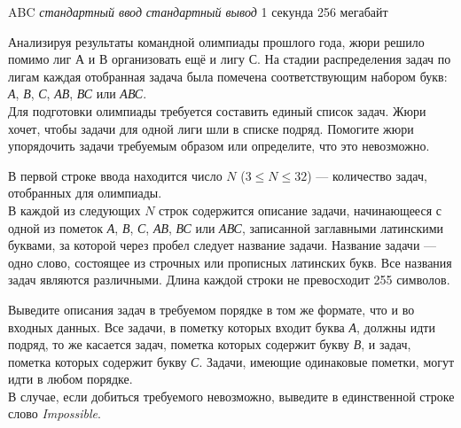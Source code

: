 \begin{problem}%
{ABC}%
{\textsl{стандартный ввод}}%
{\textsl{стандартный вывод}}%
{1 секунда}%
{256 мегабайт}{}

Анализируя результаты командной олимпиады прошлого года, жюри решило помимо лиг А и В организовать ещё и лигу С. На стадии распределения задач по лигам каждая отобранная задача была помечена соответствующим набором букв: \textit{А}, \textit{В}, \textit{С}, \textit{АВ}, \textit{ВС} или \textit{АВС}.\\

Для подготовки олимпиады требуется составить единый список задач. Жюри хочет, чтобы задачи для одной лиги шли в списке подряд. Помогите жюри упорядочить задачи требуемым образом или определите, что это невозможно.

\InputFile

В первой строке ввода находится число $N$ ($3 \le N \le 32$) — количество задач, отобранных для олимпиады.\\

В каждой из следующих $N$ строк содержится описание задачи, начинающееся с одной из пометок \textit{А}, \textit{В}, \textit{С}, \textit{АВ}, \textit{ВС} или \textit{АВС}, записанной заглавными латинскими буквами, за которой через пробел следует название задачи. Название задачи — одно слово, состоящее из строчных или прописных латинских букв. Все названия задач являются различными. Длина каждой строки не превосходит 255 символов.

\OutputFile

Выведите описания задач в требуемом порядке в том же формате, что и во входных данных. Все задачи, в пометку которых входит буква \textit{А}, должны идти подряд, то же касается задач, пометка которых содержит букву \textit{В}, и задач, пометка которых содержит букву \textit{С}. Задачи, имеющие одинаковые пометки, могут идти в любом порядке.\\

В случае, если добиться требуемого невозможно, выведите в единственной строке слово \textit{Impossible}.

\Examples

\begin{example}
%
%
\end{example}
\end{problem}